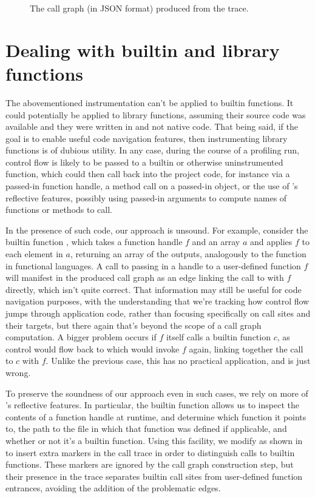\begin{figure}[htbp]

\caption{The call graph (in JSON format) produced from the trace.}
\label{Fig:Callgraph}
\end{figure}

\section{Dealing with builtin and library functions}

The abovementioned instrumentation can't be applied to \matlab builtin
functions. It could potentially be applied to library functions, assuming their
source code was available and they were written in \matlab and not native code.
That being said, if the goal is to enable useful code navigation features, then
instrumenting library functions is of dubious utility. In any case, during the
course of a profiling run, control flow is likely to be passed to a builtin or
otherwise uninstrumented function, which could then call back into the project
code, for instance via a passed-in function handle, a method call on a
passed-in object, or the use of \matlab's reflective features, possibly using
passed-in arguments to compute names of functions or methods to call.

In the presence of such code, our approach is unsound. For example, consider
the builtin function , which takes a function handle $f$ and an
array $a$ and applies $f$ to each element in $a$, returning an array of the
outputs, analogously to the  function in functional languages. A call
to  passing in a handle to a user-defined function $f$ will
manifest in the produced call graph as an edge linking the call to
 with $f$ directly, which isn't quite correct. That information
may still be useful for code navigation purposes, with the understanding that
we're tracking how control flow jumps through application code, rather than
focusing specifically on call sites and their targets, but there again that's
beyond the scope of a call graph computation. A bigger problem occurs if $f$
itself calls a builtin function $c$, as control would flow back to
 which would invoke $f$ again, linking together the call to $c$
with $f$. Unlike the previous case, this has no practical application, and is
just wrong.

To preserve the soundness of our approach even in such cases, we rely on more
of \matlab's reflective features. In particular, the  builtin
function allows us to inspect the contents of a function handle at runtime, and
determine which function it points to, the path to the file in which that
function was defined if applicable, and whether or not it's a builtin function.
Using this facility, we modify  as
shown in  to insert extra markers in the call
trace in order to distinguish calls to builtin functions. These markers are
ignored by the call graph construction step, but their presence in the trace
separates builtin call sites from user-defined function entrances, avoiding
the addition of the problematic edges.

